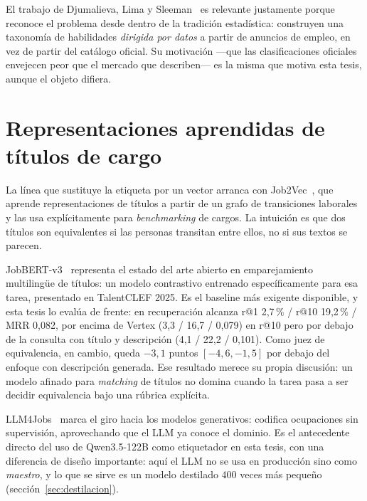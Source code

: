 \documentclass[12pt,a4paper,oneside]{report}
\begin{document}
El trabajo de Djumalieva, Lima y Sleeman~\cite{djumalieva2018} es relevante justamente
porque reconoce el problema desde dentro de la tradición estadística: construyen una
taxonomía de habilidades \emph{dirigida por datos} a partir de anuncios de empleo, en vez
de partir del catálogo oficial. Su motivación —que las clasificaciones oficiales envejecen
peor que el mercado que describen— es la misma que motiva esta tesis, aunque el objeto
difiera.

\section{Representaciones aprendidas de títulos de cargo}
\label{sec:representaciones}

La línea que sustituye la etiqueta por un vector arranca con Job2Vec~\cite{zhang2019job2vec},
que aprende representaciones de títulos a partir de un grafo de transiciones laborales y
las usa explícitamente para \emph{benchmarking} de cargos. La intuición es que dos títulos
son equivalentes si las personas transitan entre ellos, no si sus textos se parecen.

JobBERT-v3~\cite{decorte2025jobbert} representa el estado del arte abierto en
emparejamiento multilingüe de títulos: un modelo contrastivo entrenado específicamente
para esa tarea, presentado en TalentCLEF 2025. Es el baseline más exigente disponible, y
esta tesis lo evalúa de frente: en recuperación alcanza r@1 2,7\,\% / r@10 19,2\,\% /
MRR 0,082, por encima de Vertex (3,3 / 16,7 / 0,079) en r@10 pero por debajo de la
consulta con título y descripción (4,1 / 22,2 / 0,101).
Como juez de equivalencia, en cambio, queda $-3{,}1$ puntos $[-4{,}6, -1{,}5]$ por debajo
del enfoque con descripción generada. Ese resultado merece su propia discusión: un modelo
afinado para \emph{matching} de títulos no domina cuando la tarea pasa a ser decidir
equivalencia bajo una rúbrica explícita.

LLM4Jobs~\cite{hong2023llm4jobs} marca el giro hacia los modelos generativos: codifica
ocupaciones sin supervisión, aprovechando que el LLM ya conoce el dominio. Es el
antecedente directo del uso de Qwen3.5-122B como etiquetador en esta tesis, con una
diferencia de diseño importante: aquí el LLM no se usa en producción sino como
\emph{maestro}, y lo que se sirve es un modelo destilado 400 veces más pequeño
(sección~\ref{sec:destilacion}).
\end{document}
